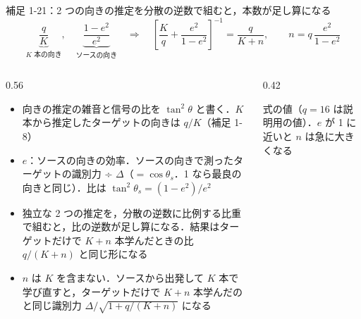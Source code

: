 \begin{frame}{補足 1-21：2 つの向きの推定を分散の逆数で組むと，本数が足し算になる}
  \label{s:p1:val}
  \vspace{-0.3em}
  {\tighteq\small
  \[ \underbrace{\frac{q}{K}}_{K\text{ 本の向き}},\quad \underbrace{\frac{1-e^2}{e^2}}_{\text{ソースの向き}} \quad\Longrightarrow\quad \left[\frac Kq + \frac{e^2}{1-e^2}\right]^{-1} = \frac{q}{K+n},\qquad n = q\,\frac{e^2}{1-e^2} \]}
  \begin{columns}[T,onlytextwidth]
    \begin{column}{0.56\textwidth}
      \begin{itemize}\scriptsize\setlength{\itemsep}{3pt}
        \item 向きの推定の雑音と信号の比を $\tan^2\theta$ と書く．$K$ 本から推定したターゲットの向きは $q/K$（補足 1-8）
        \item $e$：ソースの向きの効率．ソースの向きで測ったターゲットの識別力 ÷ $\Delta$（$= \cos\theta_s$．1 なら最良の向きと同じ）．比は $\tan^2\theta_s = (1-e^2)/e^2$
        \item 独立な 2 つの推定を，分散の逆数に比例する比重で組むと，比の逆数が足し算になる．結果はターゲットだけで $K+n$ 本学んだときの比 $q/(K+n)$ と同じ形になる
        \item $n$ は $K$ を含まない．ソースから出発して $K$ 本で学び直すと，ターゲットだけで $K+n$ 本学んだのと同じ識別力 $\Delta/\sqrt{1+q/(K+n)}$ になる
      \end{itemize}
    \end{column}
    \begin{column}{0.42\textwidth}
      \centering
      \par
      {\raggedright\tiny 式の値（$q = 16$ は説明用の値）．$e$ が 1 に近いと $n$ は急に大きくなる\par}
    \end{column}
  \end{columns}
\end{frame}

